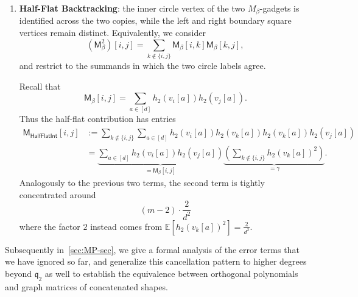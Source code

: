 \documentclass[12pt]{article}
\def \E {\mathbb{E}}
\def \al {\alpha}
\newcommand{\gam}{\gamma}
\newcommand{\cm}{\mathsf{M} }
\newcommand{\q}{\mathfrak q}
\begin{document}
\begin{enumerate}
One key observation is that the  second term is tightly concentrated around its mean independent of the choice of $s\neq t$,\[
\E \sum_{k\notin \{i,j\}} 2 v_k^2[s]v_k^2[t]  = 2 \cdot (m-2) \cdot  (\frac{1}{d})^2 = \frac{2m}{d^2 } =\gam 
 \]
 when we consider any fixed $s\neq t\in [d]$. Therefore, with some algebra after centering with respect to the mean of the second term, we show that up to some error term with $o_d(1)$ spectral norm, we have\[
 \cm_{\mathsf{HalfDiamondInt}}  = \gam \cdot \cm_\al \,.
 \] 
 
 
\item \textbf{Half-Flat Backtracking}: the inner circle vertex of the two
\(M_\beta\)-gadgets is identified across the two copies, while the left and
right boundary square vertices remain distinct. Equivalently, we consider
\[
    (\cm_\beta^2)[i,j]
    =
    \sum_{k\notin\{i,j\}}\cm_\beta[i,k]\cm_\beta[k,j],
\]
and restrict to the summands in which the two circle labels agree.

Recall that
\[
    \cm_\beta[i,j]
    =
    \sum_{a\in[d]} h_2(v_i[a])h_2(v_j[a]).
\]
Thus the half-flat contribution has entries
\[
\begin{aligned}
\cm_{\mathsf{HalfFlatInt}}[i,j]
&:=
\sum_{k\notin\{i,j\}}
\sum_{a\in[d]}
h_2(v_i[a])h_2(v_k[a])
h_2(v_k[a])h_2(v_j[a])
\\
&=
\underbrace{ \sum_{a\in[d]}
h_2(v_i[a])h_2(v_j[a])}_{=\cm_\beta[i,j]}
\underbrace{ \left(
    \sum_{k\notin\{i,j\}} h_2(v_k[a])^2
\right)}_{= \gam} .
\end{aligned}
 \]
 Analogously to the previous two terms, the second term is tightly concentrated around
 \[ 
 (m-2) \cdot \frac{2}{d^2}
 \]
 where the factor $2$ instead comes from $\E[h_2(v_k[a])^2] = \frac{2}{d^2}$.
  \end{enumerate}

 Subsequently in~\cref{sec:MP-sec}, we give a formal analysis of the error terms that we have ignored so far, and generalize this cancellation pattern to higher degrees beyond $\q_2$ as well to establish the equivalence between orthogonal polynomials and graph matrices of concatenated shapes. 
 
\end{document}
